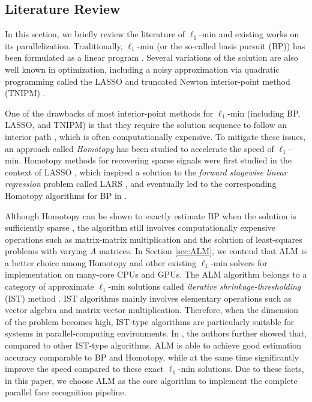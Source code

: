 \documentclass[10pt,twocolumn,letterpaper]{article}
\begin{document}
\subsection{Literature Review} 
In this section, we briefly review the literature of $\ell_1$-min and existing
works on its parallelization.  Traditionally, $\ell_1$-min (or the so-called
basis pursuit (BP)) has been formulated as a linear program
\cite{ChenS2001-SIAM}. Several variations of the solution are also well known
in optimization, including a noisy approximation via quadratic programming
called the LASSO \cite{TibshiraniR1996} and truncated Newton interior-point
method (TNIPM) \cite{KimS2007}.

One of the drawbacks of most interior-point methods for $\ell_1$-min (including
BP, LASSO, and TNIPM) is that they require the solution sequence to follow an
interior path
, which is often computationally expensive. To mitigate these
issues, an approach called \emph{Homotopy} has been studied to accelerate the
speed of $\ell_1$-min. Homotopy methods for recovering sparse signals were
first studied in the context of LASSO \cite{OsborneM2000}, which inspired a
solution to the \emph{forward stagewise linear regression} problem called LARS
\cite{EfronB2004}, and eventually led to the corresponding Homotopy algorithms
for BP in \cite{MalioutovD2005,DonohoD2006}.

Although Homotopy can be shown to exactly estimate BP when the solution is
sufficiently sparse \cite{DonohoD2006}, the algorithm still involves 
computationally expensive operations such as matrix-matrix multiplication and 
the solution of least-squares problems with varying $A$ matrices. 
In Section \ref{sec:ALM}, we contend
that ALM is a better choice among Homotopy and other existing $\ell_1$-min
solvers for implementation on many-core CPUs and GPUs. The ALM algorithm belongs to a
category of approximate $\ell_1$-min solutions called \emph{iterative
shrinkage-thresholding} (IST) method \cite{WrightS2008,BeckA2009}.
IST algorithms mainly involves elementary operations such as vector 
algebra and matrix-vector multiplication. Therefore,
when the dimension of the problem becomes high, IST-type algorithms are
particularly suitable for systems in parallel-computing environments. In
\cite{YangA2010-ICIP}, the authors further showed that, compared to other
IST-type algorithms, ALM is able to achieve good estimation accuracy comparable
to BP and Homotopy, while at the same time significantly improve the speed
compared to these exact $\ell_1$-min solutions. Due to these facts, in this
paper, we choose ALM as the core algorithm to implement the complete parallel
face recognition pipeline.
\end{document}
